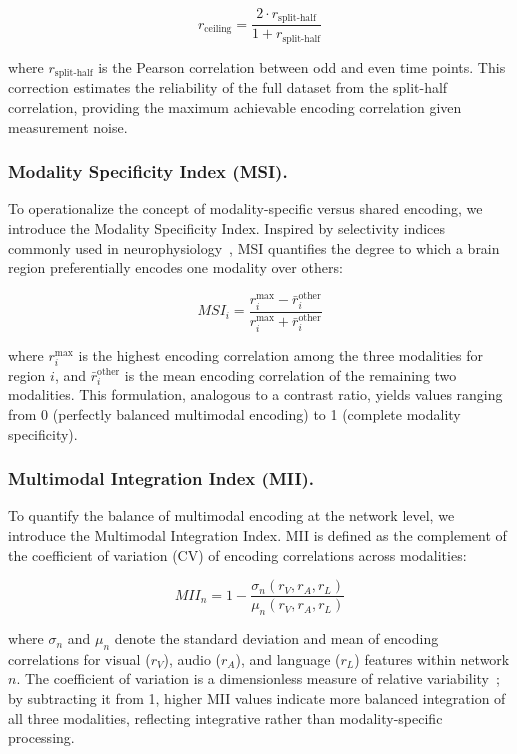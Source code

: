 \documentclass[10pt,letterpaper]{article}
\begin{document}
\begin{equation}\label{eq:ceiling}
r_{\text{ceiling}} = \frac{2 \cdot r_{\text{split-half}}}{1 + r_{\text{split-half}}}
\end{equation}

where $r_{\text{split-half}}$ is the Pearson correlation between odd and even time points. This correction estimates the reliability of the full dataset from the split-half correlation, providing the maximum achievable encoding correlation given measurement noise.

\subsubsection{Modality Specificity Index (MSI).}

To operationalize the concept of modality-specific versus shared encoding, we introduce the Modality Specificity Index. Inspired by selectivity indices commonly used in neurophysiology~\citep{desimone1984stimulus}, MSI quantifies the degree to which a brain region preferentially encodes one modality over others:

\begin{equation}\label{eq:msi}
MSI_i = \frac{r_i^{\max} - \bar{r}_i^{\text{other}}}{r_i^{\max} + \bar{r}_i^{\text{other}}}
\end{equation}

where $r_i^{\max}$ is the highest encoding correlation among the three modalities for region $i$, and $\bar{r}_i^{\text{other}}$ is the mean encoding correlation of the remaining two modalities. This formulation, analogous to a contrast ratio, yields values ranging from 0 (perfectly balanced multimodal encoding) to 1 (complete modality specificity).

\subsubsection{Multimodal Integration Index (MII).}

To quantify the balance of multimodal encoding at the network level, we introduce the Multimodal Integration Index. MII is defined as the complement of the coefficient of variation (CV) of encoding correlations across modalities:

\begin{equation}\label{eq:mii}
MII_n = 1 - \frac{\sigma_n(r_V, r_A, r_L)}{\mu_n(r_V, r_A, r_L)}
\end{equation}

where $\sigma_n$ and $\mu_n$ denote the standard deviation and mean of encoding correlations for visual ($r_V$), audio ($r_A$), and language ($r_L$) features within network $n$. The coefficient of variation is a dimensionless measure of relative variability~\citep{everitt2010cambridge}; by subtracting it from 1, higher MII values indicate more balanced integration of all three modalities, reflecting integrative rather than modality-specific processing.
\end{document}

